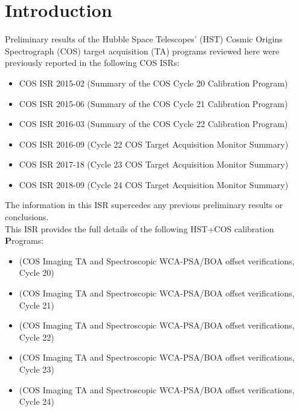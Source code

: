 \section{Introduction}\label{sec:Introduction}

Preliminary results of the Hubble Space Telescopes' (HST) Cosmic Origins Spectrograph (COS) target acquisition (TA) programs reviewed here were previously reported in the following COS ISRs:
\small
\begin{itemize}
\item{COS ISR 2015-02 (Summary of the COS Cycle 20 Calibration Program)}
\item{COS ISR 2015-06 (Summary of the COS Cycle 21 Calibration Program)}
\item{COS ISR 2016-03 (Summary of the COS Cycle 22 Calibration Program)}
\item{COS ISR 2016-09 (Cycle 22 COS Target Acquisition Monitor Summary)}
\item{COS ISR 2017-18 (Cycle 23 COS Target Acquisition Monitor Summary)}
\item{COS ISR 2018-09 (Cycle 24 COS Target Acquisition Monitor Summary)}
\end{itemize}
\normalsize
The information in this ISR supercedes any previous preliminary results or conclusions.\\

This ISR provides the full details of the following HST+COS calibration {\bf P}rograms:
\small
\begin{itemize}
\item{ (COS Imaging TA and Spectroscopic WCA-PSA/BOA offset verifications, Cycle 20)}
\item{ (COS Imaging TA and Spectroscopic WCA-PSA/BOA offset verifications, Cycle 21)}
\item{ (COS Imaging TA and Spectroscopic WCA-PSA/BOA offset verifications, Cycle 22)}
\item{ (COS Imaging TA and Spectroscopic WCA-PSA/BOA offset verifications, Cycle 23)}
\item{ (COS Imaging TA and Spectroscopic WCA-PSA/BOA offset verifications, Cycle 24)}
\end{itemize}
\normalsize

